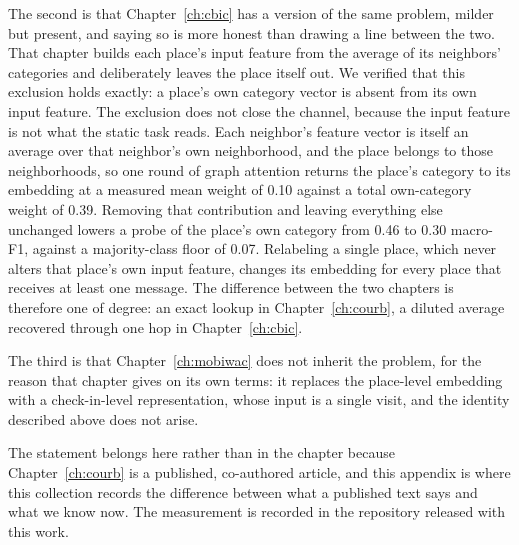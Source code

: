 The second is that Chapter~\ref{ch:cbic} has a version of the same problem, milder but present, and
saying so is more honest than drawing a line between the two. That chapter builds each place's input
feature from the average of its neighbors' categories and deliberately leaves the place itself out.
We verified that this exclusion holds exactly: a place's own category vector is absent from its own
input feature. The exclusion does not close the channel, because the input feature is not what the
static task reads. Each neighbor's feature vector is itself an average over that neighbor's own
neighborhood, and the place belongs to those neighborhoods, so one round of graph attention returns
the place's category to its embedding at a measured mean weight of 0.10 against a total own-category
weight of 0.39. Removing that contribution and leaving everything else unchanged lowers a probe of
the place's own category from 0.46 to 0.30 macro-F1, against a majority-class floor of 0.07.
Relabeling a single place, which never alters that place's own input feature, changes its embedding
for every place that receives at least one message. The difference between the two chapters is
therefore one of degree: an exact lookup in Chapter~\ref{ch:courb}, a diluted average recovered
through one hop in Chapter~\ref{ch:cbic}.

The third is that Chapter~\ref{ch:mobiwac} does not inherit the problem, for the reason
that chapter gives on its own terms: it replaces the place-level embedding with a
check-in-level representation, whose input is a single visit, and the identity described
above does not arise.

The statement belongs here rather than in the chapter because Chapter~\ref{ch:courb} is a published,
co-authored article, and this appendix is where this collection records the difference between what
a published text says and what we know now. The
measurement is recorded in the repository released with this work.
